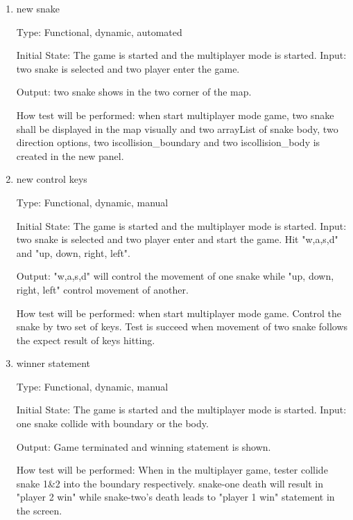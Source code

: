 \documentclass[12pt, titlepage]{article}
\begin{document}
\begin{enumerate}

\item{new snake\\}

Type: Functional, dynamic, automated
					
Initial State: The game is started and the multiplayer mode is started.
Input: two snake is selected and two player enter the game.
					
Output: two snake shows in the two corner of the map.
					
How test will be performed: when start multiplayer mode game, two snake shall be displayed in the map visually and two arrayList of snake body, two direction options, two iscollision\_boundary and two iscollision\_body is created in the new panel.

\item{new control keys\\}

Type: Functional, dynamic, manual
					
Initial State: The game is started and the multiplayer mode is started.
Input: two snake is selected and two player enter and start the game. Hit "w,a,s,d" and "up, down, right, left".
					
Output: "w,a,s,d" will control the movement of one snake while "up, down, right, left" control movement of another.
					
How test will be performed: when start multiplayer mode game. Control the snake by two set of keys. Test is succeed when movement of two snake follows the expect result of keys hitting.

\item{winner statement\\}

Type: Functional, dynamic, manual
					
Initial State: The game is started and the multiplayer mode is started.
Input: one snake collide with boundary or the body.
					
Output: Game terminated and winning statement is shown.
					
How test will be performed: When in the multiplayer game, tester collide snake 1\&2 into the boundary respectively. snake-one death will result in "player 2 win" while snake-two's death leads to "player 1 win" statement in the screen.


\end{enumerate}
\end{document}
